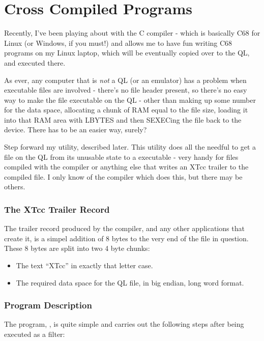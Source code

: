 \chapter{Cross Compiled Programs}\label{chp-cross-compiled-programs}

Recently, I've been playing about with the  C compiler - which is basically C68 for Linux (or Windows, if you must!) and allows me to have fun writing C68 programs on my Linux laptop, which will be eventually copied over to the QL, and executed there.

As ever, any computer that is \emph{not} a QL (or an emulator) has a problem when executable files are involved - there's no file header present, so there's no easy way to make the file executable on the QL - other than making up some number for the data space, allocating a chunk of RAM equal to the file size, loading it into that RAM area with LBYTES and then SEXECing the file back to the device. There has to be an easier way, surely?

Step forward my  utility, described later. This utility does all the needful to get a file on the QL from its unusable state to a executable - very handy for files compiled with the  compiler or anything else that writes an XTcc trailer to the compiled file. I only know of the  compiler which does this, but there may be others.


\subsection{The XTcc Trailer Record}

The trailer record produced by the compiler, and any other applications that create it, is a simpel addition of 8 bytes to the very end of the file in question. These 8 bytes are split into two 4 byte chunks:

\begin{itemize}
	\item The text ``XTcc'' in exactly that letter case.
	\item The required data space for the QL file, in big endian, long word format.
\end{itemize}


\subsection{Program Description}

The program, , is quite simple and carries out the following steps after being executed as a filter:

